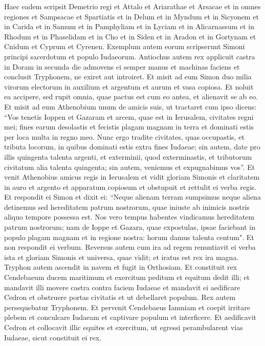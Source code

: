 \begin{biblechapter}
\verse Haec eadem scripsit Demetrio regi et Attalo et Ariarathae et Arsacae 
\verse et in omnes regiones et Sampsacae et Spartiatis et in Delum et in Myndum et in Sicyonem et in Carida et in Samum et in Pamphyliam et in Lyciam et in Alicarnassum et in Rhodum et in Phaselidam et in Cho et in Siden et in Aradon et in Gortynam et Cnidum et Cyprum et Cyrenen.  
\verse Exemplum autem eorum scripserunt Simoni principi sacerdotum et populo Iudaeorum. 
\verse Antiochus autem rex applicuit castra in Doram in secunda die admovens ei semper manus et machinas faciens et conclusit Tryphonem, ne exiret aut introiret. 
\verse Et misit ad eum Simon duo milia virorum electorum in auxilium et argentum et aurum et vasa copiosa. 
\verse Et noluit ea accipere, sed rupit omnia, quae pactus est cum eo antea, et alienavit se ab eo. 
\verse Et misit ad eum Athenobium unum de amicis suis, ut tractaret cum ipso dicens: “Vos tenetis Ioppen et Gazaram et arcem, quae est in Ierusalem, civitates regni mei; 
\verse fines earum desolastis et fecistis plagam magnam in terra et dominati estis per loca multa in regno meo. 
\verse Nunc ergo tradite civitates, quas occupastis, et tributa locorum, in quibus dominati estis extra fines Iudaeae; 
\verse sin autem, date pro illis quingenta talenta argenti, et exterminii, quod exterminastis, et tributorum civitatum alia talenta quingenta; sin autem, veniemus et expugnabimus vos”. 
\verse Et venit Athenobius amicus regis in Ierusalem et vidit gloriam Simonis et claritatem in auro et argento et apparatum copiosum et obstupuit et rettulit ei verba regis. 
\verse Et respondit ei Simon et dixit ei: “Neque alienam terram sumpsimus neque aliena detinemus sed hereditatem patrum nostrorum, quae iniuste ab inimicis nostris aliquo tempore possessa est. 
\verse Nos vero tempus habentes vindicamus hereditatem patrum nostrorum; 
\verse nam de Ioppe et Gazara, quae expostulas, ipsae faciebant in populo plagam magnam et in regione nostra: horum damus talenta centum". Et non respondit ei verbum. 
\verse Reversus autem cum ira ad regem renuntiavit ei verba ista et gloriam Simonis et universa, quae vidit; et iratus est rex ira magna. 
\verse Tryphon autem ascendit in navem et fugit in Orthosiam. 
\verse Et constituit rex Cendebaeum ducem maritimum et exercitum peditum et equitum dedit illi; 
\verse et mandavit illi movere castra contra faciem Iudaeae et mandavit ei aedificare Cedron et obstruere portas civitatis et ut debellaret populum. Rex autem persequebatur Tryphonem. 
\verse Et pervenit Cendebaeus Iamniam et coepit irritare plebem et conculcare Iudaeam et captivare populum et interficere. 
\verse Et aedificavit Cedron et collocavit illic equites et exercitum, ut egressi perambularent vias Iudaeae, sicut constituit ei rex. 
\end{biblechapter}


